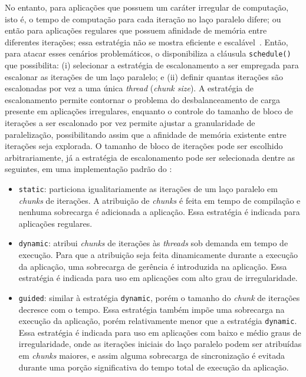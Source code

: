 \documentclass{SBCbookchapter}
\begin{document}
		
		No entanto, para aplicações que possuem um caráter irregular de
		computação, isto é, o tempo de computação para cada iteração no laço
		paralelo difere; ou então para aplicações regulares que possuem
		afinidade de memória entre diferentes iterações; essa estratégia não
		se mostra eficiente e escalável~\cite{Carino2008a}. Então, para atacar esses
		cenários problemáticos, o \openmp disponibiliza a cláusula
		\texttt{schedule()} que possibilita: (i) selecionar a estratégia de
		escalonamento a ser empregada para escalonar as
		iterações de um laço paralelo; e (ii) definir quantas iterações são
		escalonadas por vez a uma única \textit{thread} (\textit{chunk size}).
		A estratégia de escalonamento permite contornar o problema do
		desbalanceamento de carga presente em aplicações irregulares,
		enquanto o controle do tamanho de bloco de iterações a ser escalonado
		por vez permite ajustar a granularidade de paralelização, possibilitando
		assim que a afinidade de memória existente entre iterações seja explorada.
		O tamanho de bloco de iterações pode ser escolhido arbitrariamente,
		já a estratégia de escalonamento pode ser selecionada dentre as
		seguintes, em uma implementação padrão do \openmp:
		\begin{itemize}
			\item \texttt{static}: particiona igualitariamente as iterações de um
			laço paralelo em \textit{chunks} de iterações. A atribuição de \textit{chunks}
			é feita em tempo de compilação e nenhuma sobrecarga é
			adicionada a aplicação. Essa estratégia é indicada para
			aplicações regulares.
			
			\item \texttt{dynamic}: atribui \textit{chunks} de iterações às \textit{threads} sob
			demanda em tempo de execução. Para que a atribuição seja feita
			dinamicamente durante a execução da aplicação, uma sobrecarga de
			gerência é introduzida na aplicação. Essa estratégia é indicada
			para uso em aplicações com alto grau de irregularidade.

			\item \texttt{guided}: similar à estratégia \texttt{dynamic}, porém o tamanho do
			\textit{chunk} de iterações decresce com o tempo. Essa estratégia
			também impõe uma sobrecarga na execução da aplicação, porém
			relativamente menor que a estratégia \texttt{dynamic}. Essa
			estratégia é indicada para uso em aplicações com baixo e
			médio graus de irregularidade, onde as iterações iniciais
			do laço paralelo podem ser atribuídas em \textit{chunks} maiores, e
			assim alguma sobrecarga de sincronização é evitada durante uma porção
			significativa do tempo total de execução da aplicação.
		\end{itemize}
		
\end{document}
